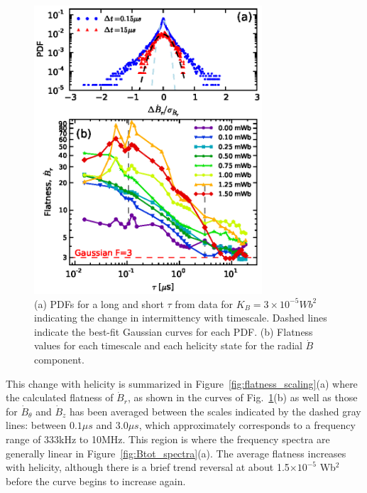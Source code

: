 \documentclass[aps,prl,amsmath,amssymb,reprint,superscriptaddress]{revtex4-1} %
\begin{document}
\begin{figure}[!htbp]
\centerline{
\includegraphics[width=8.5cm]{figure3.eps}}
\caption{\label{fig:Br_flatness} (a) PDFs for a long and short $\tau$ from data for $K_{B} = 3\times 10^{-5} Wb^{2}$ indicating the change in intermittency with timescale. Dashed lines indicate the best-fit Gaussian curves for each PDF. (b) Flatness values for each timescale and each helicity state for the radial $\dot{B}$ component.}
\end{figure}

This change with helicity is summarized in Figure~\ref{fig:flatness_scaling}(a) where the calculated flatness of $\dot{B}_{r}$, as shown in the curves of Fig.~\ref{fig:Br_flatness}(b) as well as those for $\dot{B}_{\theta}$ and $\dot{B}_{z}$ has been averaged between the scales indicated by the dashed gray lines: between $0.1\mu s$ and $3.0\mu s$, which approximately corresponds to a frequency range of 333kHz to 10MHz. This region is where the frequency spectra are generally linear in Figure~\ref{fig:Btot_spectra}(a). The average flatness increases with helicity, although there is a brief trend reversal at about 1.5$\times 10^{-5}$ Wb$^{2}$ before the curve begins to increase again.
\end{document}
